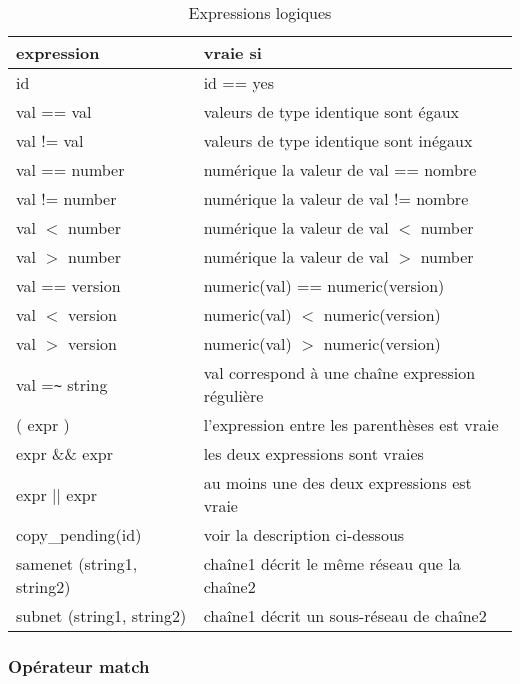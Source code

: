   \begin{table}[htb]
      \centering
      \caption{Expressions logiques}
      \label{tab:expr}
      \begin{tabular}{ll}
        \hline
        expression &                     vraie si\\
        \hline
        \hline
       id                    &  id == \og{}yes\fg{}\\
       val  == val           &  valeurs de type identique sont égaux\\
       val  != val           &  valeurs de type identique sont inégaux\\
       val  == number        &  numérique la valeur de val == nombre\\
       val  != number        &  numérique la valeur de val != nombre\\
       val  $<$  number      &  numérique la valeur de val $<$  number\\
       val  $>$  number      &  numérique la valeur de val $>$  number\\
       val  == version       &  numeric(val) == numeric(version)\\
       val  $<$  version     &  numeric(val) $<$  numeric(version)\\
       val  $>$  version     &  numeric(val) $>$  numeric(version)\\
       val  =\verb?~? string &  val correspond à une chaîne expression régulière\\
       ( expr )              &  l'expression entre les parenthèses est vraie\\
       expr \&\& expr        &  les deux expressions sont vraies\\
       expr || expr          &  au moins une des deux expressions est vraie\\
       copy\_pending(id)     &  voir la description ci-dessous\\
       samenet (string1, string2) & chaîne1 décrit le même réseau que la chaîne2\\
       subnet (string1, string2)  & chaîne1 décrit un sous-réseau de chaîne2\\
        \hline
      \end{tabular}
  \end{table}


\subsubsection{Opérateur \og{}match\fg{}}

